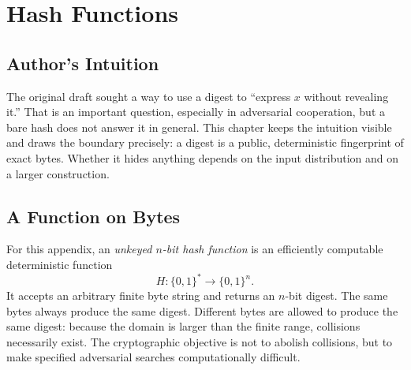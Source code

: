 \chapter{Hash Functions}
\label{chap:hash-functions}
\raggedbottom

\section*{Author's Intuition}

The original draft sought a way to use a digest to ``express \(x\) without
revealing it.'' That is an important question, especially in adversarial
cooperation, but a bare hash does not answer it in general. This chapter keeps
the intuition visible and draws the boundary precisely: a digest is a public,
deterministic fingerprint of exact bytes. Whether it hides anything depends on
the input distribution and on a larger construction.

\begin{abstract}
This appendix introduces cryptographic hash functions as deterministic maps
from byte strings to fixed-length digests. It separates preimage,
second-preimage, and collision resistance; derives the familiar generic work
factors only in an idealized model; and distinguishes an observed avalanche
effect from a security proof. It then explains why an unkeyed digest is not
encryption, anonymity, a message-authentication code, a signature, a
commitment, password hashing, or a key-derivation function. The C companion
uses the repository's sole cryptographic backend, libsodium, to compute
BLAKE2b-256 test vectors. MD5 appears only as a historical collision example.
\end{abstract}

\section{A Function on Bytes}

For this appendix, an \emph{unkeyed \(n\)-bit hash function} is an efficiently
computable deterministic function
\[
    H : \{0,1\}^{*} \longrightarrow \{0,1\}^{n}.
\]
It accepts an arbitrary finite byte string and returns an \(n\)-bit digest.
The same bytes always produce the same digest. Different bytes are allowed to
produce the same digest: because the domain is larger than the finite range,
collisions necessarily exist. The cryptographic objective is not to abolish
collisions, but to make specified adversarial searches computationally
difficult.


